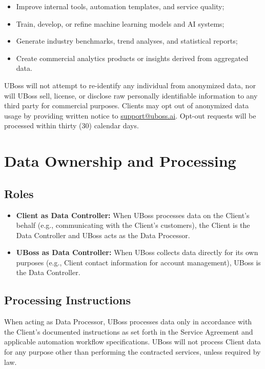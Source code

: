 \documentclass[11pt,letterpaper,parskip=half]{scrartcl}
\begin{document}
\begin{itemize}[nosep, leftmargin=1.5em]
    \item Improve internal tools, automation templates, and service quality;
    \item Train, develop, or refine machine learning models and AI systems;
    \item Generate industry benchmarks, trend analyses, and statistical reports;
    \item Create commercial analytics products or insights derived from aggregated data.
\end{itemize}

UBoss will not attempt to re-identify any individual from anonymized data, nor will UBoss sell, license, or disclose raw personally identifiable information to any third party for commercial purposes. Clients may opt out of anonymized data usage by providing written notice to \href{mailto:support@uboss.ai}{support@uboss.ai}. Opt-out requests will be processed within thirty (30) calendar days.

\section{Data Ownership and Processing}

\subsection{Roles}

\begin{itemize}[nosep, leftmargin=1.5em]
    \item \textbf{Client as Data Controller:} When UBoss processes data on the Client's behalf (e.g., communicating with the Client's customers), the Client is the Data Controller and UBoss acts as the Data Processor.
    \item \textbf{UBoss as Data Controller:} When UBoss collects data directly for its own purposes (e.g., Client contact information for account management), UBoss is the Data Controller.
\end{itemize}

\subsection{Processing Instructions}

When acting as Data Processor, UBoss processes data only in accordance with the Client's documented instructions as set forth in the Service Agreement and applicable automation workflow specifications. UBoss will not process Client data for any purpose other than performing the contracted services, unless required by law.
\end{document}
